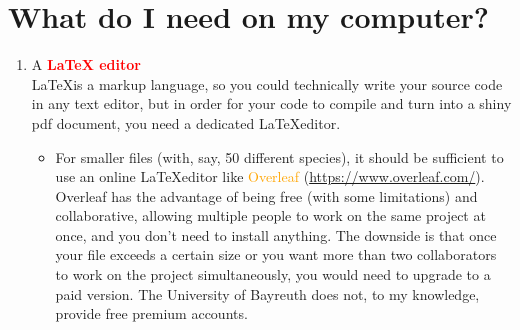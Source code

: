 \documentclass[a4paper,12pt,twoside]{article}
\begin{document}
\section{What do I need on my computer?} \label{ch:computer}
\begin{enumerate}
    \item A \textcolor{red}{\textbf{LaTeX editor}} \\
        \LaTeX is a markup language, so you could technically write your source code in any text editor, but in order for your code to compile and turn into a shiny pdf document, you need a dedicated \LaTeX editor.
        \begin{itemize}
            \item For smaller files (with, say, 50 different species), it should be sufficient to use an online \LaTeX editor like \textcolor{orange}{Overleaf} (\url{https://www.overleaf.com/}). Overleaf has the advantage of being free (with some limitations) and collaborative, allowing multiple people to work on the same project at once, and you don’t need to install anything. The downside is that once your file exceeds a certain size or you want more than two collaborators to work on the project simultaneously, you would need to upgrade to a paid version. The University of Bayreuth does not, to my knowledge, provide free premium accounts. 
            

\end{itemize}
\end{enumerate}
\end{document}
